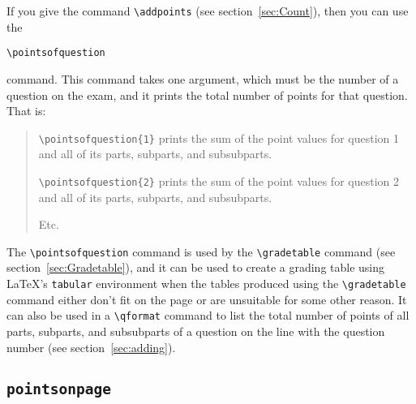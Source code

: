 \documentclass[12pt]{exam}
\begin{document}
If you give the command \verb"\addpoints" (see
section~\ref{sec:Count}), then you can use the
\begin{center}
  \verb"\pointsofquestion"
\end{center}
command.  This command takes one argument, which must be the number of
a question on the exam, and it prints the total number of points for
that question.  That is:
\begin{quote}
  \verb"\pointsofquestion{1}" prints the sum of the point values for
  question 1 and all of its parts, subparts, and subsubparts.

  \verb"\pointsofquestion{2}" prints the sum of the point values for
  question 2 and all of its parts, subparts, and subsubparts.

  Etc.
\end{quote}
The \verb"\pointsofquestion" command is used by the \verb"\gradetable"
command (see section~\ref{sec:Gradetable}), and it can be used to
create a grading table using \LaTeX's \verb"tabular" environment when
the tables produced using the \verb"\gradetable" command either don't
fit on the page or are unsuitable for some other reason.  It can also
be used in a \verb"\qformat" command to list the total number of
points of all parts, subparts, and subsubparts of a question on the
line with the question number (see section~\ref{sec:adding}).



\subsection{\texttt{pointsonpage}}
\label{sec:pointsonp}
\end{document}
